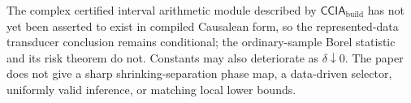 The complex certified interval arithmetic module described by \(\mathsf{CCIA}_{\mathrm{build}}\) has not yet been asserted to exist in compiled Causalean form, so the represented-data transducer conclusion remains conditional; the ordinary-sample Borel statistic and its risk theorem do not. Constants may also deteriorate as \(\delta\downarrow0\). The paper does not give a sharp shrinking-separation phase map, a data-driven selector, uniformly valid inference, or matching local lower bounds.